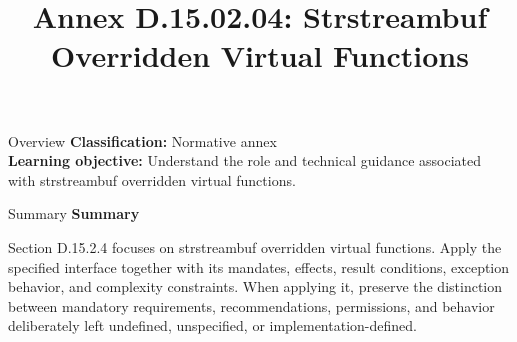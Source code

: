 \documentclass[10pt,letterpaper]{article}
\title{Annex D.15.02.04: Strstreambuf Overridden Virtual Functions}
\author{}
\date{}
\begin{document}
\maketitle
\begin{CornellOverviewBox}{Overview}
\textbf{Classification:} Normative annex\\[2pt]
\textbf{Learning objective:} Understand the role and technical guidance associated with strstreambuf overridden virtual functions.
\end{CornellOverviewBox}\begin{CornellSummaryBox}{Summary}
{\sffamily\bfseries\color{Accent} Summary}\par\vspace{3pt}Section D.15.2.4 focuses on strstreambuf overridden virtual functions. Apply the specified interface together with its mandates, effects, result conditions, exception behavior, and complexity constraints. When applying it, preserve the distinction between mandatory requirements, recommendations, permissions, and behavior deliberately left undefined, unspecified, or implementation-defined.
\end{CornellSummaryBox}
\end{document}
